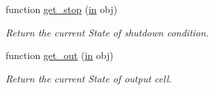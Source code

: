 \begin{DoxyCompactItemize}
function \hyperlink{class_wrapper_aaba4a98b8b3bf391348722f0f227e333}{get\+\_\+stop} (\hyperlink{class_wrapper_a5e252d97ca5bf85c5753e2914673eead}{in} obj)
\begin{DoxyCompactList}\small\item\em Return the current State of shutdown condition. \end{DoxyCompactList}\item 
function \hyperlink{class_wrapper_a15af7c208437e3c98d1f130b45a36a37}{get\+\_\+out} (\hyperlink{class_wrapper_a5e252d97ca5bf85c5753e2914673eead}{in} obj)
\begin{DoxyCompactList}\small\item\em Return the current State of output cell. \end{DoxyCompactList}\end{DoxyCompactItemize}
